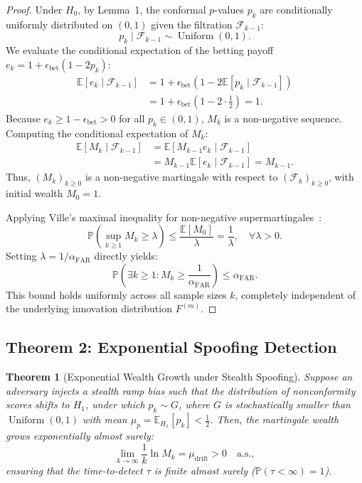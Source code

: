 \documentclass[journal,twocolumn]{IEEEtran}
\newtheorem{theorem}{Theorem}
\newcommand{\E}{\mathbb{E}}
\newcommand{\Prob}{\mathbb{P}}
\begin{document}
\begin{proof}
Under $H_0$, by Lemma~1, the conformal $p$-values $p_k$ are conditionally uniformly distributed on $(0, 1)$ given the filtration $\mathcal{F}_{k-1}$:
\begin{equation}
    p_k \mid \mathcal{F}_{k-1} \sim \operatorname{Uniform}(0, 1).
\end{equation}
We evaluate the conditional expectation of the betting payoff $e_k = 1 + \epsilon_{\text{bet}} (1 - 2 p_k)$:
\begin{align}
    \E[e_k \mid \mathcal{F}_{k-1}] &= 1 + \epsilon_{\text{bet}} \left( 1 - 2 \E[p_k \mid \mathcal{F}_{k-1}] \right) \nonumber \\
    &= 1 + \epsilon_{\text{bet}} \left( 1 - 2 \cdot \frac{1}{2} \right) = 1.
\end{align}
Because $e_k \ge 1 - \epsilon_{\text{bet}} > 0$ for all $p_k \in (0, 1)$, $M_k$ is a non-negative sequence. Computing the conditional expectation of $M_k$:
\begin{align}
    \E[M_k \mid \mathcal{F}_{k-1}] &= \E[M_{k-1} e_k \mid \mathcal{F}_{k-1}] \nonumber \\
    &= M_{k-1} \E[e_k \mid \mathcal{F}_{k-1}] = M_{k-1}.
\end{align}
Thus, $(M_k)_{k \ge 0}$ is a non-negative martingale with respect to $(\mathcal{F}_k)_{k \ge 0}$, with initial wealth $M_0 = 1$.

Applying Ville's maximal inequality for non-negative supermartingales~\cite{ville1939etude,ramdas2023game}:
\begin{equation}
    \Prob\left( \sup_{k \ge 1} M_k \ge \lambda \right) \le \frac{\E[M_0]}{\lambda} = \frac{1}{\lambda}, \quad \forall \lambda > 0.
\end{equation}
Setting $\lambda = 1 / \alpha_{\mathrm{FAR}}$ directly yields:
\begin{equation}
    \Prob\left( \exists k \ge 1 : M_k \ge \frac{1}{\alpha_{\mathrm{FAR}}} \right) \le \alpha_{\mathrm{FAR}}.
\end{equation}
This bound holds uniformly across all sample sizes $k$, completely independent of the underlying innovation distribution $F^{(m)}$.
\end{proof}

\subsection{Theorem 2: Exponential Spoofing Detection}
\begin{theorem}[Exponential Wealth Growth under Stealth Spoofing]
Suppose an adversary injects a stealth ramp bias such that the distribution of nonconformity scores shifts to $H_1$, under which $p_k \sim G$, where $G$ is stochastically smaller than $\operatorname{Uniform}(0, 1)$ with mean $\mu_p = \E_{H_1}[p_k] < \frac{1}{2}$. Then, the martingale wealth grows exponentially almost surely:
\begin{equation}
    \lim_{k \to \infty} \frac{1}{k} \ln M_k = \mu_{\text{drift}} > 0 \quad \text{a.s.},
\end{equation}
ensuring that the time-to-detect $\tau$ is finite almost surely ($\Prob(\tau < \infty) = 1$).
\label{thm:exp_detection}
\end{theorem}
\end{document}
